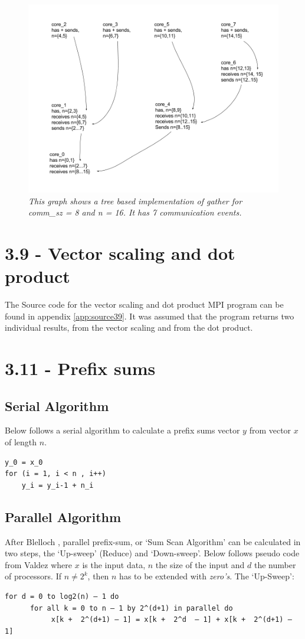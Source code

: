 \documentclass[a4paper,11pt,twoside]{article}
\begin{document}
\begin{figure}

  \centering
  \includegraphics[width=1\textwidth]{gather.png}
  \caption{\textit{This graph shows a tree based implementation of gather for comm\_sz = 8 and n = 16. It has 7 communication events.}}
  \label{fig:gather}
\end{figure}

\section{3.9 - Vector scaling and dot product}
The Source code for the vector scaling and dot product MPI program can be found in appendix \ref{app:source39}. It was assumed that the program returns two individual results, from the vector scaling and from the dot product. 


\section{3.11 - Prefix sums}
\subsection*{Serial Algorithm}
Below follows a serial algorithm to calculate a prefix sums vector $y$ from vector $x$ of length $n$.
\begin{verbatim}
y_0 = x_0
for (i = 1, i < n , i++)
    y_i = y_i-1 + n_i
\end{verbatim}

\subsection*{Parallel Algorithm}
After Blelloch \cite{blelloch1990}, parallel prefix-sum, or `Sum Scan Algorithm' can be calculated in two steps, the `Up-sweep' (Reduce) and `Down-sweep'. Below follows pseudo code from Valdez \cite{valdez2012} where $x$ is the input data, $n$ the size of the input and $d$ the number of processors. If $n \neq 2^{k}$, then $n$ has to be extended with \textit{zero's}. The `Up-Sweep':
\begin{verbatim}
for d = 0 to log2(n) – 1 do 
      for all k = 0 to n – 1 by 2^(d+1) in parallel do 
           x[k +  2^(d+1) – 1] = x[k +  2^d  – 1] + x[k +  2^(d+1) – 1]
\end{verbatim}
\end{document}
